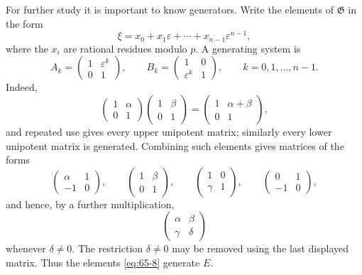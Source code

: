 \documentclass[11pt]{article}
\begin{document}
For further study it is important to know generators.  Write the elements of \(\mathfrak G\) in the form
\begin{equation}\label{eq:65-7}
 \xi=x_0+x_1\varepsilon+\cdots+x_{n-1}\varepsilon^{n-1},
\end{equation}
where the \(x_i\) are rational residues modulo \(p\).  A generating system is
\begin{equation}\label{eq:65-8}
 A_k=\begin{pmatrix}1&\varepsilon^k\\0&1\end{pmatrix},
 \qquad
 B_k=\begin{pmatrix}1&0\\\varepsilon^k&1\end{pmatrix},
 \qquad k=0,1,\ldots,n-1.
\end{equation}
Indeed,
\[
 \begin{pmatrix}1&\alpha\\0&1\end{pmatrix}
 \begin{pmatrix}1&\beta\\0&1\end{pmatrix}
 =
 \begin{pmatrix}1&\alpha+\beta\\0&1\end{pmatrix},
\]
and repeated use gives every upper unipotent matrix; similarly every lower unipotent matrix is generated.  Combining such elements gives matrices of the forms
\[
 \begin{pmatrix}\alpha&1\\-1&0\end{pmatrix},
 \qquad
 \begin{pmatrix}1&\beta\\0&1\end{pmatrix},
 \qquad
 \begin{pmatrix}1&0\\\gamma&1\end{pmatrix},
 \qquad
 \begin{pmatrix}0&1\\-1&0\end{pmatrix},
\]
and hence, by a further multiplication,
\begin{equation}\label{eq:65-11}
 \begin{pmatrix}\alpha&\beta\\\gamma&\delta\end{pmatrix}
\end{equation}
whenever \(\delta\ne0\).  The restriction \(\delta\ne0\) may be removed using the last displayed matrix.  Thus the elements \eqref{eq:65-8} generate \(E\).
\end{document}
